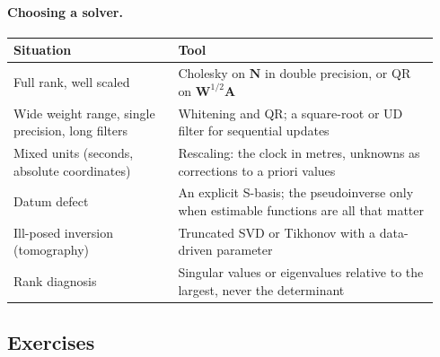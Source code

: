 \documentclass[main.tex]{subfiles}
\begin{document}
\paragraph{Choosing a solver.}
\begin{center}
\small
\begin{tabular}{@{}>{\raggedright\arraybackslash}p{0.36\linewidth}>{\raggedright\arraybackslash}p{0.58\linewidth}@{}}
\toprule
Situation & Tool \\
\midrule
Full rank, well scaled & Cholesky on $\bm{N}$ in double precision, or QR on
  $\bm{W}^{1/2}\bm{A}$ \\
Wide weight range, single precision, long filters & Whitening and QR; a
  square-root or UD filter for sequential updates \\
Mixed units (seconds, absolute coordinates) & Rescaling: the clock in
  metres, unknowns as corrections to a priori values \\
Datum defect & An explicit S-basis; the pseudoinverse only when estimable
  functions are all that matter \\
Ill-posed inversion (tomography) & Truncated SVD or Tikhonov with a
  data-driven parameter \\
Rank diagnosis & Singular values or eigenvalues relative to the largest,
  never the determinant \\
\bottomrule
\end{tabular}
\end{center}

\subsection{Exercises}\label{sec:la-exercises}
\end{document}
